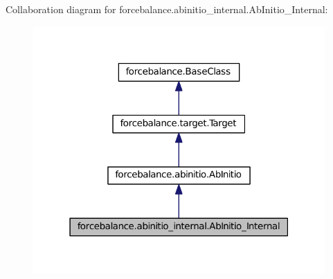\-Collaboration diagram for forcebalance.\-abinitio\-\_\-internal.\-Ab\-Initio\-\_\-\-Internal\-:
\nopagebreak
\begin{figure}[H]
\begin{center}
\leavevmode
\includegraphics[width=316pt]{classforcebalance_1_1abinitio__internal_1_1AbInitio__Internal__coll__graph}
\end{center}
\end{figure}

